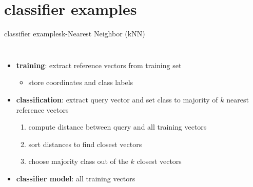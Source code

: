     \section[examples]{classifier examples}
        \begin{frame}{classifier examples}{k-Nearest Neighbor (kNN)}
            \vspace{-5mm}
            \begin{columns}
                    \begin{itemize}
                        \item	\textbf{training}: extract reference vectors from training set 
                            \begin{itemize}
                                \item store coordinates and class labels
                            \end{itemize}
                        \bigskip
                        \item<2->	\textbf{classification}: extract query vector and set class to majority of $k$ nearest reference vectors
                            \begin{enumerate}
                                \item   compute distance between query and all training vectors
                                \item   sort distances to find closest vectors
                                \item   choose majority class out of the $k$ closest vectors
                            \end{enumerate}
                        \bigskip
                        \item<3->	\textbf{classifier model}: all training vectors
                    \end{itemize}
            \end{columns}
        \end{frame}
        
